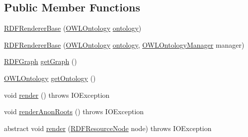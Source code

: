 \subsection*{Public Member Functions}
\begin{DoxyCompactItemize}
\item 
\hyperlink{classorg_1_1coode_1_1owlapi_1_1rdf_1_1renderer_1_1_r_d_f_renderer_base_aa33ba0dd6ac1c0b8631109b976166299}{R\-D\-F\-Renderer\-Base} (\hyperlink{interfaceorg_1_1semanticweb_1_1owlapi_1_1model_1_1_o_w_l_ontology}{O\-W\-L\-Ontology} \hyperlink{classorg_1_1coode_1_1owlapi_1_1rdf_1_1renderer_1_1_r_d_f_renderer_base_a1c2e169e03ca2cdf866ca19387b258e4}{ontology})
\item 
\hyperlink{classorg_1_1coode_1_1owlapi_1_1rdf_1_1renderer_1_1_r_d_f_renderer_base_ac151fc9a71ffe73dacf3eeec289ed5d8}{R\-D\-F\-Renderer\-Base} (\hyperlink{interfaceorg_1_1semanticweb_1_1owlapi_1_1model_1_1_o_w_l_ontology}{O\-W\-L\-Ontology} \hyperlink{classorg_1_1coode_1_1owlapi_1_1rdf_1_1renderer_1_1_r_d_f_renderer_base_a1c2e169e03ca2cdf866ca19387b258e4}{ontology}, \hyperlink{interfaceorg_1_1semanticweb_1_1owlapi_1_1model_1_1_o_w_l_ontology_manager}{O\-W\-L\-Ontology\-Manager} manager)
\item 
\hyperlink{classorg_1_1coode_1_1owlapi_1_1rdf_1_1model_1_1_r_d_f_graph}{R\-D\-F\-Graph} \hyperlink{classorg_1_1coode_1_1owlapi_1_1rdf_1_1renderer_1_1_r_d_f_renderer_base_a5c2a08f27c270443e8bc24672fbb5018}{get\-Graph} ()
\item 
\hyperlink{interfaceorg_1_1semanticweb_1_1owlapi_1_1model_1_1_o_w_l_ontology}{O\-W\-L\-Ontology} \hyperlink{classorg_1_1coode_1_1owlapi_1_1rdf_1_1renderer_1_1_r_d_f_renderer_base_ab3ffd02ec3da6ca454bdee41c014cdc0}{get\-Ontology} ()
\item 
void \hyperlink{classorg_1_1coode_1_1owlapi_1_1rdf_1_1renderer_1_1_r_d_f_renderer_base_a8eca0f5066cc6ac3b432d4c3ccd87919}{render} ()  throws I\-O\-Exception 
\item 
void \hyperlink{classorg_1_1coode_1_1owlapi_1_1rdf_1_1renderer_1_1_r_d_f_renderer_base_afad68ddf8c59c3ce2d5e0c2997ae60f2}{render\-Anon\-Roots} ()  throws I\-O\-Exception 
\item 
abstract void \hyperlink{classorg_1_1coode_1_1owlapi_1_1rdf_1_1renderer_1_1_r_d_f_renderer_base_a7ee19c5d1834515ab0c2a63733fbf7ab}{render} (\hyperlink{classorg_1_1coode_1_1owlapi_1_1rdf_1_1model_1_1_r_d_f_resource_node}{R\-D\-F\-Resource\-Node} node)  throws I\-O\-Exception
\end{DoxyCompactItemize}
